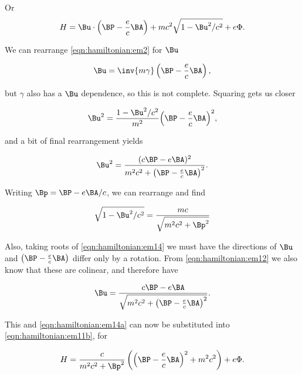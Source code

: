 Or
\begin{align}\label{eqn:hamiltonian:em11b}
H = \Bu \cdot \left(\BP - \frac{e}{c} \BA\right) + m c^2 \sqrt{1 - \Bu^2/c^2} + e \Phi.
\end{align}

We can rearrange \ref{eqn:hamiltonian:em2} for $\Bu$

\begin{align}\label{eqn:hamiltonian:em12}
\Bu = \inv{m \gamma} \left( \BP - \frac{e}{c} \BA \right),
\end{align}

but $\gamma$ also has a $\Bu$ dependence, so this is not complete.  Squaring gets us closer

\begin{align}\label{eqn:hamiltonian:em13}
\Bu^2 = \frac{1 - \Bu^2/c^2}{m^2} {\left( \BP - \frac{e}{c} \BA \right)}^2,
\end{align}

and a bit of final rearrangement yields

\begin{align}\label{eqn:hamiltonian:em14}
\Bu^2 = \frac{(c \BP - e \BA)^2}{m^2 c^2 + {\left( \BP - \frac{e}{c} \BA \right)}^2}.
\end{align}

Writing $\Bp = \BP - e \BA/c$, we can rearrange and find

\begin{align}\label{eqn:hamiltonian:em14a}
\sqrt{1 - \Bu^2/c^2} = \frac{m c }{\sqrt{m^2 c^2 +\Bp^2}}
\end{align}

Also, taking roots of \ref{eqn:hamiltonian:em14} we must have the directions of $\Bu$ and $\left( \BP - \frac{e}{c} \BA \right)$ differ only by a rotation.  From \ref{eqn:hamiltonian:em12} we also know that these are colinear, and therefore have

\begin{align}\label{eqn:hamiltonian:em15}
\Bu = \frac{c \BP - e \BA}{\sqrt{m^2 c^2 + {\left( \BP - \frac{e}{c} \BA \right)}^2}}.
\end{align}

This and \ref{eqn:hamiltonian:em14a} can now be substituted into \ref{eqn:hamiltonian:em11b}, for

\begin{align}\label{eqn:hamiltonian:em11c}
H = \frac{c}{m^2 c^2 + \Bp^2} 
\left(
{\left(\BP - \frac{e}{c} \BA\right)}^2 + m^2 c^2 
\right)
+ e \Phi.
\end{align}

